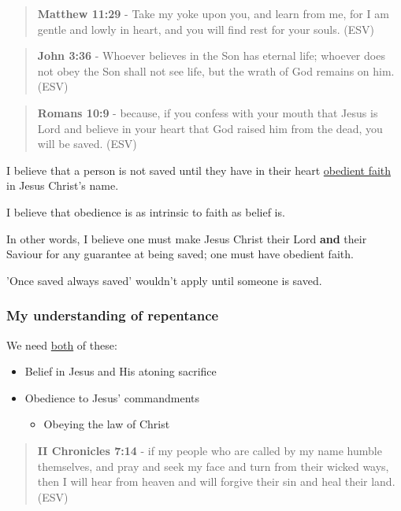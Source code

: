 \documentclass[11pt]{article}
\begin{document}
\begin{quote}
\textbf{Matthew 11:29} - Take my yoke upon you, and learn from me, for I am gentle and lowly in heart, and you will find rest for your souls. (ESV)
\end{quote}

\begin{quote}
\textbf{John 3:36} - Whoever believes in the Son has eternal life; whoever does not obey the Son shall not see life, but the wrath of God remains on him. (ESV)
\end{quote}

\begin{quote}
\textbf{Romans 10:9} - because, if you confess with your mouth that Jesus is Lord and believe in your heart that God raised him from the dead, you will be saved. (ESV)
\end{quote}

I believe that a person is not saved until they have in their heart \uline{obedient faith} in Jesus Christ's name.

I believe that obedience is as intrinsic to faith as belief is.

In other words, I believe one must make Jesus Christ their Lord \textbf{and} their Saviour for any guarantee at being saved; one must have obedient faith.

'Once saved always saved' wouldn't apply until someone is saved.

\subsubsection{My understanding of repentance}
\label{sec:orge13def4}
We need \uline{both} of these:
\begin{itemize}
\item Belief in Jesus and His atoning sacrifice
\item Obedience to Jesus' commandments
\begin{itemize}
\item Obeying the law of Christ
\end{itemize}
\end{itemize}

\begin{quote}
\textbf{II Chronicles 7:14} - if my people who are called by my name humble themselves, and pray and seek my face and turn from their wicked ways, then I will hear from heaven and will forgive their sin and heal their land. (ESV)
\end{quote}
\end{document}
